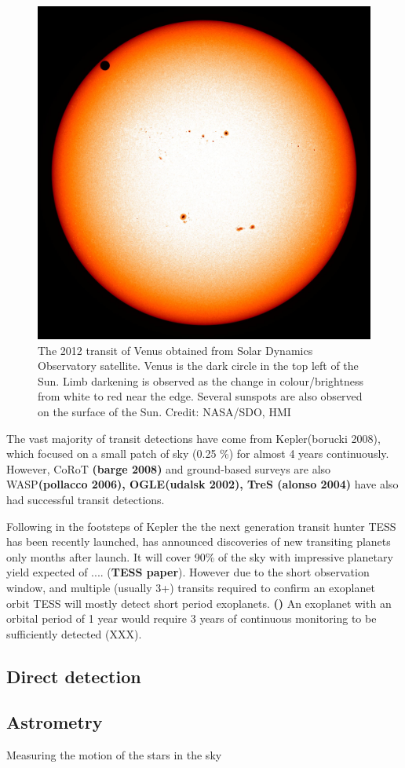 \begin{figure}
    \centering
    \includegraphics[width=0.3\linewidth]{./figures/introduction/SDO_2012_Venus_Transit.jpg}
    \caption{The 2012 transit of Venus obtained from Solar Dynamics Observatory satellite. Venus is the dark circle in the top left of the Sun. Limb darkening is observed as the change in colour/brightness from white to red near the edge. Several sunspots are also observed on the surface of the Sun. Credit: NASA/SDO, HMI}
    \label{fig:transit_venus}
\end{figure}


The vast majority of transit detections have come from Kepler(borucki 2008), which focused on a small patch of sky (0.25 \%) for almost 4 years continuously.
However, CoRoT \textbf{(barge 2008)} and ground-based surveys are also WASP\textbf{(pollacco 2006), OGLE(udalsk 2002), TreS (alonso 2004) } have also had successful transit detections.

Following in the footsteps of Kepler the the next generation transit hunter TESS has been recently launched, has announced discoveries of new transiting planets only months after launch.
It will cover 90\% of the sky with impressive planetary yield expected of 
.... (\textbf{TESS paper}).
However due to the short observation window, and multiple (usually 3+) transits required to confirm an exoplanet orbit TESS will mostly detect short period exoplanets.\textbf{ ()}
An exoplanet with an orbital period of 1 year would require 3 years of continuous monitoring to be sufficiently detected (XXX).



\subsection{Direct detection}

\subsection{Astrometry}

Measuring the motion of the stars in the sky


